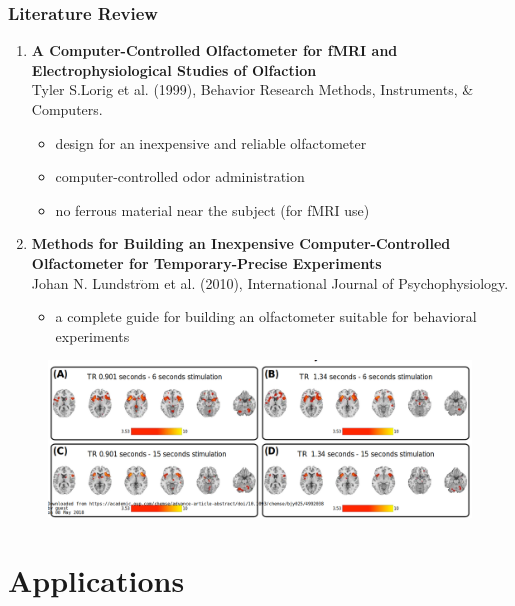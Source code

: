 \documentclass{beamer}
\newcounter{saveenumi}
\newcommand{\conti}{\setcounter{enumi}{\value{saveenumi}}}
\begin{document}
\begin{frame}
\frametitle{Literature Review}
\begin{enumerate}
	\conti
	\item \textrm{\textbf{A Computer-Controlled Olfactometer for fMRI and Electrophysiological Studies of Olfaction}}
	\\
	Tyler S.Lorig et al. (1999), Behavior Research Methods, Instruments, \& Computers.
	\begin{itemize}
		\item
		design for an inexpensive and reliable olfactometer
		\item
		computer-controlled odor administration
		\item
		no ferrous material near the subject (for fMRI use)
	\end{itemize}
	\item \textrm{\textbf{Methods for Building an Inexpensive Computer-Controlled Olfactometer for Temporary-Precise Experiments}}
	\\
	Johan N. Lundstr$\ddot{\textrm{o}}$m et al. (2010), International Journal of Psychophysiology.
	\begin{itemize}
		\item
		a complete guide for building an olfactometer suitable for behavioral experiments
	\end{itemize}
	
\end{enumerate}
\end{frame}



\begin{frame}
\begin{figure}
\includegraphics[scale=0.2]{img1.png}
\end{figure}
\end{frame}

\section{Applications} 
\end{document}
